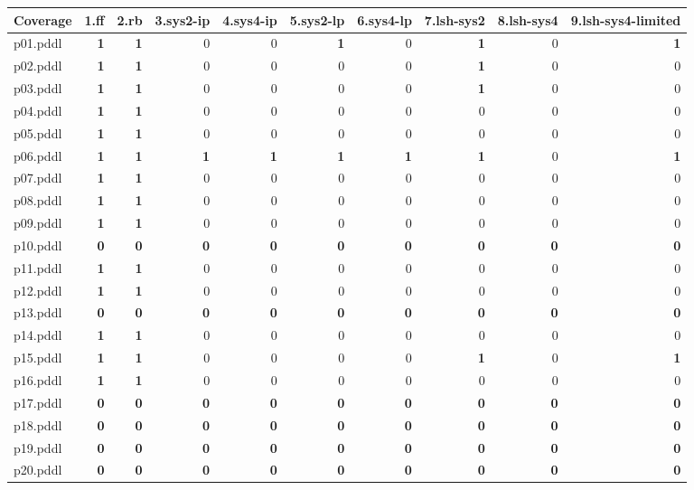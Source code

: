 \documentclass{article}
\begin{document}
\begin{tabular}{@{}lrrrrrrrrr@{}}
Coverage & 1.ff & 2.rb & 3.sys2-ip & 4.sys4-ip & 5.sys2-lp & 6.sys4-lp & 7.lsh-sys2 & 8.lsh-sys4 & 9.lsh-sys4-limited \\
\midrule
p01.pddl & \textbf{1} & \textbf{1} & 0 & 0 & \textbf{1} & 0 & \textbf{1} & 0 & \textbf{1} \\
p02.pddl & \textbf{1} & \textbf{1} & 0 & 0 & 0 & 0 & \textbf{1} & 0 & 0 \\
p03.pddl & \textbf{1} & \textbf{1} & 0 & 0 & 0 & 0 & \textbf{1} & 0 & 0 \\
p04.pddl & \textbf{1} & \textbf{1} & 0 & 0 & 0 & 0 & 0 & 0 & 0 \\
p05.pddl & \textbf{1} & \textbf{1} & 0 & 0 & 0 & 0 & 0 & 0 & 0 \\
p06.pddl & \textbf{1} & \textbf{1} & \textbf{1} & \textbf{1} & \textbf{1} & \textbf{1} & \textbf{1} & 0 & \textbf{1} \\
p07.pddl & \textbf{1} & \textbf{1} & 0 & 0 & 0 & 0 & 0 & 0 & 0 \\
p08.pddl & \textbf{1} & \textbf{1} & 0 & 0 & 0 & 0 & 0 & 0 & 0 \\
p09.pddl & \textbf{1} & \textbf{1} & 0 & 0 & 0 & 0 & 0 & 0 & 0 \\
p10.pddl & \textbf{0} & \textbf{0} & \textbf{0} & \textbf{0} & \textbf{0} & \textbf{0} & \textbf{0} & \textbf{0} & \textbf{0} \\
p11.pddl & \textbf{1} & \textbf{1} & 0 & 0 & 0 & 0 & 0 & 0 & 0 \\
p12.pddl & \textbf{1} & \textbf{1} & 0 & 0 & 0 & 0 & 0 & 0 & 0 \\
p13.pddl & \textbf{0} & \textbf{0} & \textbf{0} & \textbf{0} & \textbf{0} & \textbf{0} & \textbf{0} & \textbf{0} & \textbf{0} \\
p14.pddl & \textbf{1} & \textbf{1} & 0 & 0 & 0 & 0 & 0 & 0 & 0 \\
p15.pddl & \textbf{1} & \textbf{1} & 0 & 0 & 0 & 0 & \textbf{1} & 0 & \textbf{1} \\
p16.pddl & \textbf{1} & \textbf{1} & 0 & 0 & 0 & 0 & 0 & 0 & 0 \\
p17.pddl & \textbf{0} & \textbf{0} & \textbf{0} & \textbf{0} & \textbf{0} & \textbf{0} & \textbf{0} & \textbf{0} & \textbf{0} \\
p18.pddl & \textbf{0} & \textbf{0} & \textbf{0} & \textbf{0} & \textbf{0} & \textbf{0} & \textbf{0} & \textbf{0} & \textbf{0} \\
p19.pddl & \textbf{0} & \textbf{0} & \textbf{0} & \textbf{0} & \textbf{0} & \textbf{0} & \textbf{0} & \textbf{0} & \textbf{0} \\
p20.pddl & \textbf{0} & \textbf{0} & \textbf{0} & \textbf{0} & \textbf{0} & \textbf{0} & \textbf{0} & \textbf{0} & \textbf{0} \\
\end{tabular}
\end{document}
